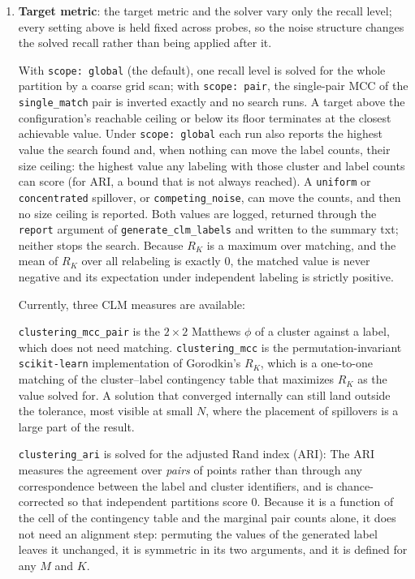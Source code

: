 \documentclass[a4paper,12pt]{article}
\begin{document}
\begin{enumerate}
    \item \textbf{Target metric}: the target metric and the solver vary only the recall level; every setting above is held fixed across probes, so the noise structure changes the solved recall rather than being applied after it.

With \texttt{scope: global} (the default), one recall level is solved for the whole partition by a coarse grid scan; with \texttt{scope: pair}, the single-pair MCC of the \texttt{single\_match} pair is inverted exactly and no search runs. A target above the configuration's reachable ceiling or below its floor terminates at the closest achievable value. Under \texttt{scope: global} each run also reports the highest value the search found and, when nothing can move the label counts, their size ceiling: the highest value any labeling with those cluster and label counts can score (for ARI, a bound that is not always reached). A \texttt{uniform} or \texttt{concentrated} spillover, or \texttt{competing\_noise}, can move the counts, and then no size ceiling is reported. Both values are logged, returned through the \texttt{report} argument of \texttt{generate\_clm\_labels} and written to the summary txt; neither stops the search. Because $R_K$ is a maximum over matching, and the mean of $R_K$ over all relabeling is exactly $0$, the matched value is never negative and its expectation under independent labeling is strictly positive. 
    
Currently, three CLM measures are available: 

\texttt{clustering\_mcc\_pair} is the $2\times2$ Matthews $\phi$ of a cluster against a label, which does not need matching. \texttt{clustering\_mcc} is the permutation-invariant \texttt{scikit-learn} implementation of Gorodkin's  $R_K$, which is a one-to-one matching of the cluster--label contingency table that maximizes $R_K$ as the value solved for. A solution that converged internally can still land outside the tolerance, most visible at small $N$, where the placement of spillovers is a large part of the result.

\texttt{clustering\_ari} is solved for the adjusted Rand index (ARI): The ARI measures the agreement over \emph{pairs} of points rather than through any correspondence between the label and cluster identifiers, and is chance-corrected so that independent partitions score $0$. Because it is a function of the cell of the contingency table and the marginal pair counts alone, it does not need an alignment step: permuting the values of the generated label leaves it unchanged, it is symmetric in its two arguments, and it is defined for any $M$ and $K$.
    

\end{enumerate}
\end{document}
